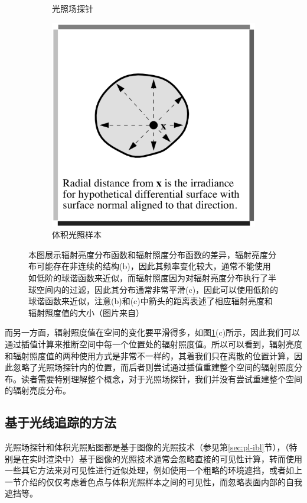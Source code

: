 \begin{figure}
\begin{fullwidth}
\begin{subfigure}[b]{0.33\thewidth}
			\caption{光照场探针}
	\end{subfigure}
	\begin{subfigure}[b]{0.33\thewidth}
		\includegraphics[width=\textwidth]{figures/pl/light-field-3}
			\caption{体积光照样本}
	\end{subfigure}
	\caption{本图展示辐射亮度分布函数和辐射照度分布函数的差异，辐射亮度分布可能存在非连续的结构(b)，因此其频率变化较大，通常不能使用如低阶的球谐函数来近似，而辐射照度因为对辐射亮度分布执行了半球空间内的过滤，因此其分布通常非常平滑(c)，因此可以使用低阶的球谐函数来近似，注意(b)和(c)中箭头的距离表述了相应辐射亮度和辐射照度值的大小（图片来自\cite{a:TheIrradianceVolume}）}
	\label{f:pl-light-field}
\end{fullwidth}
\end{figure}

而另一方面，辐射照度值在空间的变化要平滑得多，如图\ref{f:pl-light-field}(c)所示，因此我们可以通过插值计算来推断空间中每一个位置处的辐射照度值。所以可以看到，辐射亮度和辐射照度值的两种使用方式是非常不一样的，其着我们只在离散的位置计算，因此忽略了光照场探针内的位置，而后者则尝试通过插值重建整个空间的辐射照度分布。读者需要特别理解整个概念，对于光照场探针，我们并没有尝试重建整个空间的辐射亮度分布。




\subsection{基于光线追踪的方法}
光照场探针和体积光照贴图都是基于图像的光照技术（参见第\ref{sec:pl-ibl}节），（特别是在实时渲染中）基于图像的光照技术通常会忽略直接的可见性计算，转而使用一些其它方法来对可见性进行近似处理，例如使用一个粗略的环境遮挡，或者如上一节介绍的仅仅考虑着色点与体积光照样本之间的可见性，而忽略表面内部的自我遮挡等。

